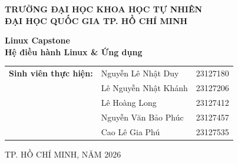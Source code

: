 \documentclass[a4paper,12pt]{article}
\begin{document}
\begin{titlepage}
    \begin{center}
        \vspace*{1cm}
        \Large\textbf{TRƯỜNG ĐẠI HỌC KHOA HỌC TỰ NHIÊN}\\
        \large\textbf{ĐẠI HỌC QUỐC GIA TP. HỒ CHÍ MINH}\\
        \vspace{1.5cm}
        
        \begin{figure}[H]
            \centering
        \end{figure}
        \vspace{1.5cm}
        
        \LARGE\textbf{Linux Capstone}\\
        \vspace{0.3cm}
        \Large\textbf{Hệ điều hành Linux \& Ứng dụng}\\
        \vspace{2cm}
        
        \begin{tabular}{lll}
            \textbf{Sinh viên thực hiện:} & Nguyễn Lê Nhật Duy & 23127180 \\
                                         & Lê Nguyễn Nhật Khánh & 23127206 \\
                                         & Lê Hoàng Long & 23127412 \\
                                         & Nguyễn Văn Bảo Phúc & 23127457 \\
                                         & Cao Lê Gia Phú & 23127535 \\
        \end{tabular}
        
        \vfill
        \large TP. HỒ CHÍ MINH, NĂM 2026
    \end{center}
\end{titlepage}
\end{document}
